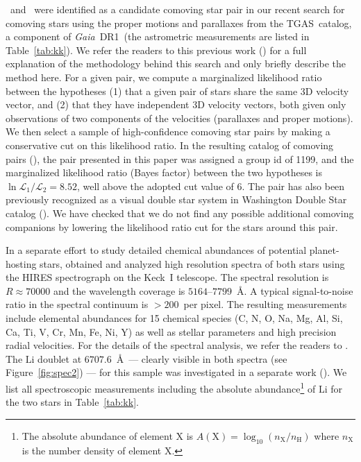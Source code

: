 \documentclass[modern, letterpaper]{aastex61}
\newcommand{\project}[1]{\textsl{#1}}
\newcommand{\acronym}[1]{{\small{#1}}}
\newcommand{\gaia}{\project{Gaia}}
\newcommand{\figname}{Figure}
\newcommand{\dr}{\acronym{DR1}}
\newcommand{\tgas}{\acronym{TGAS}}
\newcommand*\elem[1]{\ensuremath{\mathrm{#1}}}
\newcommand{\sunanalog}{\text{Krios}}
\newcommand{\bizarreone}{\text{Kronos}}
\renewcommand\tablename{Table}
\begin{document}
\sunanalog\ and \bizarreone\ were identified as a
candidate comoving star pair in our recent search for comoving stars using the
proper motions and parallaxes from the \tgas\ catalog, a component of \gaia\ \dr\
(the astrometric measurements are listed in \tablename~\ref{tab:kk}).
We refer the readers to this previous work (\citealt{2017AJ....153..257O}) for a
full explanation of the methodology behind this search and only briefly describe
the method here.
For a given pair, we compute a marginalized likelihood ratio between the
hypotheses (1) that a given pair of stars share the same 3D velocity vector, and
(2) that they have independent 3D velocity vectors, both given only observations
of two components of the velocities (parallaxes and proper motions).
We then select a sample of high-confidence comoving star pairs by making a
conservative cut on this likelihood ratio.
In the resulting catalog of comoving pairs (\citealt{2017AJ....153..257O}),
the pair presented in this paper was assigned a group id of 1199,
and the marginalized likelihood ratio (Bayes factor)
between the two hypotheses is $\ln{\mathcal{L}_1/\mathcal{L}_2} = 8.52$,
well above the adopted cut value of 6.
The pair has also been previously recognized as a visual double star system
in Washington Double Star catalog (\citealt{2001AJ....122.3466M}).
We have checked that we do not find any possible additional comoving companions
by lowering the likelihood ratio cut for the stars around this pair.

In a separate effort to study detailed chemical abundances of potential
planet-hosting stars, \citet{2016ApJS..225...32B} obtained and analyzed high resolution
spectra of both stars using the HIRES spectrograph on the Keck~I telescope.
The spectral resolution is $R\approx 70000$ and the wavelength coverage is
$5164$--$7799$~\AA.
A typical signal-to-noise ratio in the spectral continuum is $>200$~per pixel.
The resulting measurements include elemental abundances for 15 chemical species
(C, N, O, Na, Mg, Al, Si, Ca, Ti, V, Cr, Mn, Fe, Ni, Y) as well as stellar parameters
and high precision radial velocities.
For the details of the spectral analysis, we refer the readers to
\citealt{2016ApJS..225...32B}.
The \elem{Li} doublet at $6707.6$~\AA\ --- clearly visible in both spectra (see
\figname~\ref{fig:spec2}) --- for this sample was investigated in a separate
work (\citealt{jmlithium}).
We list all spectroscopic measurements including
the absolute abundance\footnote{
  The absolute abundance of element \elem{X} is
  $A(\elem{X}) = \log_{10} (n_\elem{X}/n_\elem{H})$
  where $n_\elem{X}$ is the number density of element \elem{X}.
}
of \elem{Li} for the two stars in Table~\ref{tab:kk}.
\end{document}
